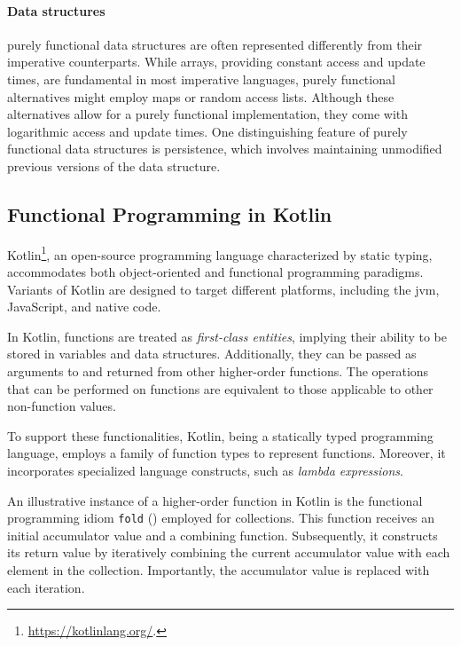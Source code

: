 \paragraph{Data structures}

purely functional data structures are often represented differently from their imperative counterparts. While arrays, providing constant access and update times, are fundamental in most imperative languages, purely functional alternatives might employ maps or random access lists. Although these alternatives allow for a purely functional implementation, they come with logarithmic access and update times. One distinguishing feature of purely functional data structures is persistence, which involves maintaining unmodified previous versions of the data structure.

\subsection{Functional Programming in Kotlin}

Kotlin\footnote{\url{https://kotlinlang.org/}.}, an open-source programming language characterized by static typing, accommodates both object-oriented and functional programming paradigms. Variants of Kotlin are designed to target different platforms, including the \ac{jvm}, JavaScript, and native code.

In Kotlin, functions are treated as \textit{first-class entities}, implying their ability to be stored in variables and data structures. Additionally, they can be passed as arguments to and returned from other higher-order functions. The operations that can be performed on functions are equivalent to those applicable to other non-function values.

To support these functionalities, Kotlin, being a statically typed programming language, employs a family of function types to represent functions. Moreover, it incorporates specialized language constructs, such as \textit{lambda expressions}.

An illustrative instance of a higher-order function in Kotlin is the functional programming idiom \texttt{fold} ()
employed for collections. This function receives an initial accumulator value and a combining function. Subsequently, it constructs its return value by iteratively combining the current accumulator value with each element in the collection. Importantly, the accumulator value is replaced with each iteration.



